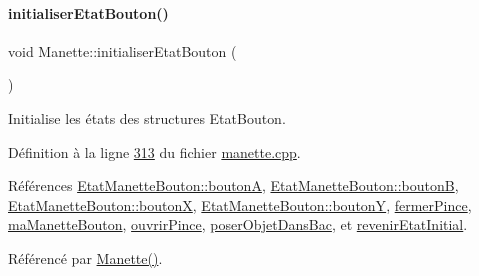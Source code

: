 \paragraph{\texorpdfstring{initialiser\+Etat\+Bouton()}{initialiserEtatBouton()}}
{\footnotesize\ttfamily void Manette\+::initialiser\+Etat\+Bouton (\begin{DoxyParamCaption}{ }\end{DoxyParamCaption})\hspace{0.3cm}{\ttfamily [private]}}



Initialise les états des structures Etat\+Bouton. 



Définition à la ligne \hyperlink{manette_8cpp_source_l00313}{313} du fichier \hyperlink{manette_8cpp_source}{manette.\+cpp}.



Références \hyperlink{manette_8h_source_l00124}{Etat\+Manette\+Bouton\+::boutonA}, \hyperlink{manette_8h_source_l00125}{Etat\+Manette\+Bouton\+::boutonB}, \hyperlink{manette_8h_source_l00126}{Etat\+Manette\+Bouton\+::boutonX}, \hyperlink{manette_8h_source_l00127}{Etat\+Manette\+Bouton\+::boutonY}, \hyperlink{manette_8h_source_l00217}{fermer\+Pince}, \hyperlink{manette_8h_source_l00215}{ma\+Manette\+Bouton}, \hyperlink{manette_8h_source_l00216}{ouvrir\+Pince}, \hyperlink{manette_8h_source_l00218}{poser\+Objet\+Dans\+Bac}, et \hyperlink{manette_8h_source_l00219}{revenir\+Etat\+Initial}.



Référencé par \hyperlink{manette_8cpp_source_l00009}{Manette()}.


